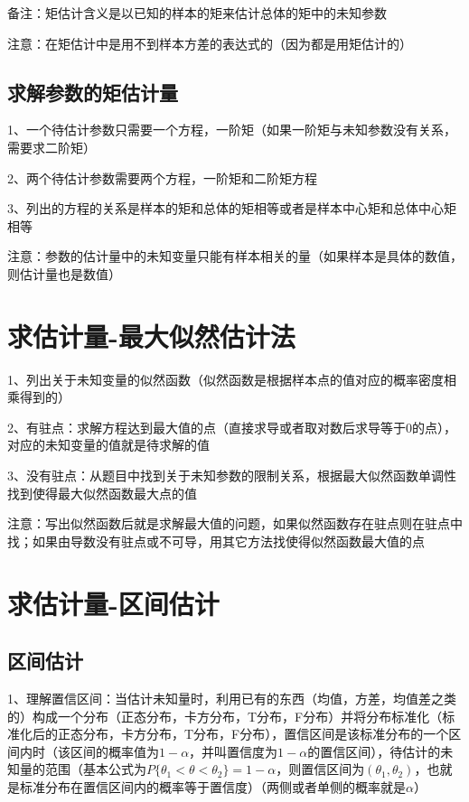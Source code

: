 备注：矩估计含义是以已知的样本的矩来估计总体的矩中的未知参数

注意：在矩估计中是用不到样本方差的表达式的（因为都是用矩估计的）



\subsection{求解参数的矩估计量}

1、一个待估计参数只需要一个方程，一阶矩（如果一阶矩与未知参数没有关系，需要求二阶矩）

2、两个待估计参数需要两个方程，一阶矩和二阶矩方程

3、列出的方程的关系是样本的矩和总体的矩相等或者是样本中心矩和总体中心矩相等

注意：参数的估计量中的未知变量只能有样本相关的量（如果样本是具体的数值，则估计量也是数值）

\section{求估计量-最大似然估计法}

1、列出关于未知变量的似然函数（似然函数是根据样本点的值对应的概率密度相乘得到的）

2、有驻点：求解方程达到最大值的点（直接求导或者取对数后求导等于0的点），对应的未知变量的值就是待求解的值

3、没有驻点：从题目中找到关于未知参数的限制关系，根据最大似然函数单调性找到使得最大似然函数最大点的值

注意：写出似然函数后就是求解最大值的问题，如果似然函数存在驻点则在驻点中找；如果由导数没有驻点或不可导，用其它方法找使得似然函数最大值的点

\section{求估计量-区间估计}



\subsection{区间估计}

1、理解置信区间：当估计未知量时，利用已有的东西（均值，方差，均值差之类的）构成一个分布（正态分布，卡方分布，T分布，F分布）并将分布标准化（标准化后的正态分布，卡方分布，T分布，F分布），置信区间是该标准分布的一个区间内时（该区间的概率值为$1-\alpha$，并叫置信度为$1-\alpha$的置信区间），待估计的未知量的范围（基本公式为$P\{ \theta_1 < \theta < \theta_2 \} = 1-\alpha$，则置信区间为$(\theta_1 , \theta_2)$，也就是标准分布在置信区间内的概率等于置信度）（两侧或者单侧的概率就是$\alpha$）



